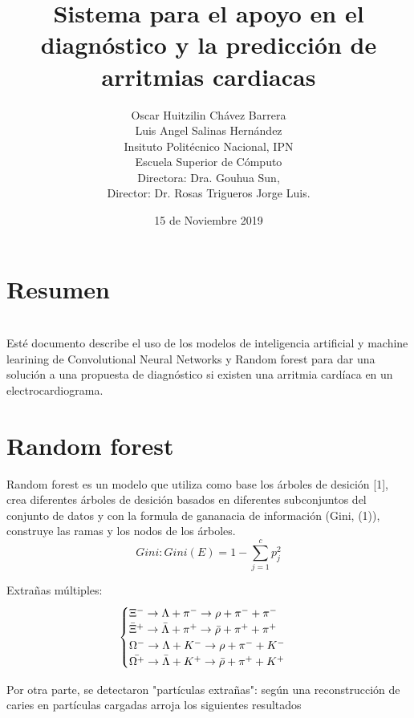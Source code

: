 \documentclass[letterpaper, 11pt]{article}
\title{Sistema para el apoyo en el diagnóstico y la predicción de arritmias cardiacas}
\author{
Oscar Huitzilin Chávez Barrera \\
Luis Angel Salinas Hernández \\
Insituto Politécnico Nacional, IPN\\
Escuela Superior de Cómputo\\
Directora: Dra. Gouhua Sun, \\
Director: Dr. Rosas Trigueros Jorge Luis. \\ 
}
\date{15 de Noviembre 2019}
\begin{document}
\maketitle

\section{Resumen}
\label{sec:intro}
\begin{multicols}{2}
\\
Esté documento describe el uso de los modelos de inteligencia artificial y machine learining de Convolutional Neural Networks y Random forest para dar una solución a una propuesta de diagnóstico si existen una arritmia cardíaca en un electrocardiograma.
\section{Random forest}
Random forest es un modelo que utiliza como base los árboles de desición [1], crea diferentes árboles de desición basados en diferentes subconjuntos del conjunto de datos y con la formula de gananacia de información (Gini, (1)), construye las ramas y los nodos de los árboles. 
\begin{equation}
\textit{Gini}: \mathit{Gini}(E) = 1 - \sum_{j=1}^{c}p_j^2
\end{equation}

Extrañas múltiples:
\begin{equation}
\begin{cases}
    \Xi^{-}\rightarrow \Lambda + \pi^{-} \rightarrow \rho + \pi^{-} + \pi^{-} \\
    \Bar{\Xi}^{+} \rightarrow \Bar{\Lambda} + \pi^{+} \rightarrow \Bar{\rho} + \pi^{+} + \pi^{+} \\
    \Omega^{-} \rightarrow \Lambda + K^{-} \rightarrow \rho + \pi^{-} + K^{-}\\
    \Bar{\Omega^{+}} \rightarrow \Bar{\Lambda} + K^{+} \rightarrow \Bar{\rho} + \pi^{+} + K^{+}
\end{cases}
\end{equation}

Por otra parte, se detectaron "partículas extrañas": según una reconstrucción de caries en partículas cargadas arroja los siguientes resultados


\end{multicols}
\end{document}
